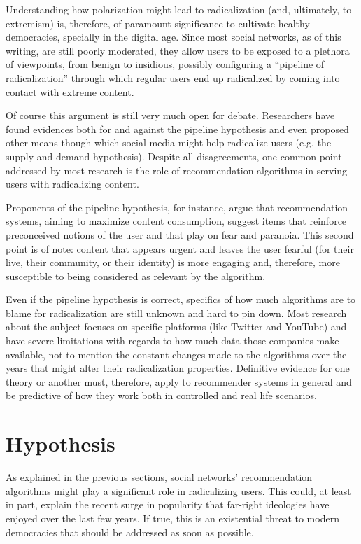 Understanding how polarization might lead to radicalization (and, ultimately, to
extremism) is, therefore, of paramount significance to cultivate healthy
democracies, specially in the digital age. Since most social networks, as of
this writing, are still poorly moderated, they allow users to be exposed to a
plethora of viewpoints, from benign to insidious, possibly configuring a
``pipeline of radicalization'' through which regular users end up radicalized by
coming into contact with extreme content.

Of course this argument is still very much open for debate. Researchers have
found evidences both for and against the pipeline hypothesis and even proposed
other means though which social media might help radicalize users (e.g. the supply
and demand hypothesis). Despite all disagreements, one common point addressed by
most research is the role of recommendation algorithms in serving users with
radicalizing content.

Proponents of the pipeline hypothesis, for instance, argue that recommendation
systems, aiming to maximize content consumption, suggest items that reinforce
preconceived notions of the user and that play on fear and paranoia. This second
point is of note: content that appears urgent and leaves the user fearful (for
their live, their community, or their identity) is more engaging and, therefore,
more susceptible to being considered as relevant by the algorithm.

Even if the pipeline hypothesis is correct, specifics of how much algorithms are
to blame for radicalization are still unknown and hard to pin down. Most
research about the subject focuses on specific platforms (like Twitter and
YouTube) and have severe limitations with regards to how much data those
companies make available, not to mention the constant changes made to the
algorithms over the years that might alter their radicalization properties.
Definitive evidence for one theory or another must, therefore, apply to
recommender systems in general and be predictive of how they work both in
controlled and real life scenarios.

\section{Hypothesis}
\label{sec:hypothesis}

As explained in the previous sections, social networks' recommendation
algorithms might play a significant role in radicalizing users. This could, at
least in part, explain the recent surge in popularity that far-right ideologies
have enjoyed over the last few years. If true, this is an existential threat to
modern democracies that should be addressed as soon as possible.

